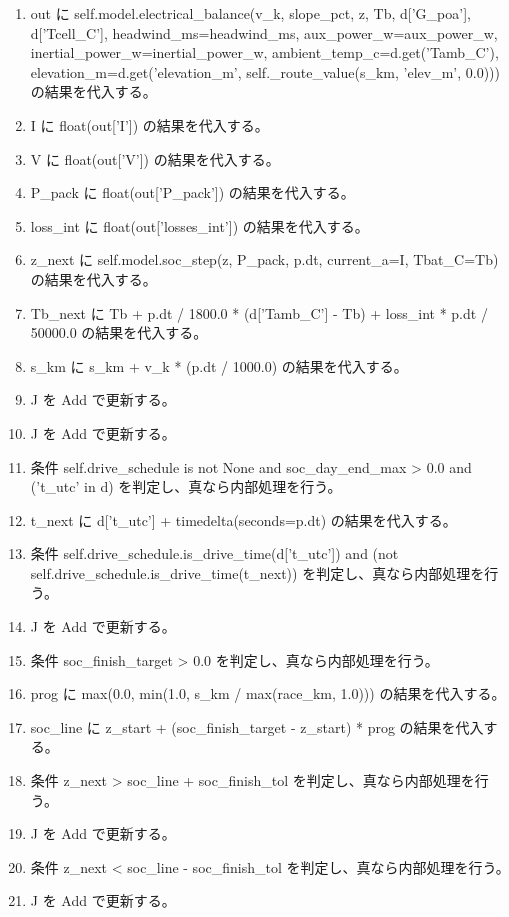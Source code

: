 \documentclass[a4paper,11pt]{article}
\begin{document}
\begin{enumerate}[leftmargin=1.8em]
\item   out に self.model.electrical\_balance(v\_k, slope\_pct, z, Tb, d['G\_poa'], d['Tcell\_C'], headwind\_ms=headwind\_ms, aux\_power\_w=aux\_power\_w, inertial\_power\_w=inertial\_power\_w, ambient\_temp\_c=d.get('Tamb\_C'), elevation\_m=d.get('elevation\_m', self.\_route\_value(s\_km, 'elev\_m', 0.0))) の結果を代入する。
\item   I に float(out['I']) の結果を代入する。
\item   V に float(out['V']) の結果を代入する。
\item   P\_pack に float(out['P\_pack']) の結果を代入する。
\item   loss\_int に float(out['losses\_int']) の結果を代入する。
\item   z\_next に self.model.soc\_step(z, P\_pack, p.dt, current\_a=I, Tbat\_C=Tb) の結果を代入する。
\item   Tb\_next に Tb + p.dt / 1800.0 * (d['Tamb\_C'] - Tb) + loss\_int * p.dt / 50000.0 の結果を代入する。
\item   s\_km に s\_km + v\_k * (p.dt / 1000.0) の結果を代入する。
\item   J を Add で更新する。
\item   J を Add で更新する。
\item   条件 self.drive\_schedule is not None and soc\_day\_end\_max > 0.0 and ('t\_utc' in d) を判定し、真なら内部処理を行う。
\item     t\_next に d['t\_utc'] + timedelta(seconds=p.dt) の結果を代入する。
\item     条件 self.drive\_schedule.is\_drive\_time(d['t\_utc']) and (not self.drive\_schedule.is\_drive\_time(t\_next)) を判定し、真なら内部処理を行う。
\item       J を Add で更新する。
\item   条件 soc\_finish\_target > 0.0 を判定し、真なら内部処理を行う。
\item     prog に max(0.0, min(1.0, s\_km / max(race\_km, 1.0))) の結果を代入する。
\item     soc\_line に z\_start + (soc\_finish\_target - z\_start) * prog の結果を代入する。
\item     条件 z\_next > soc\_line + soc\_finish\_tol を判定し、真なら内部処理を行う。
\item       J を Add で更新する。
\item     条件 z\_next < soc\_line - soc\_finish\_tol を判定し、真なら内部処理を行う。
\item       J を Add で更新する。

\end{enumerate}
\end{document}
